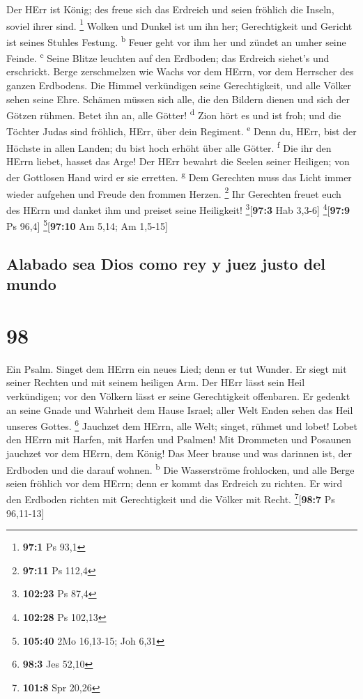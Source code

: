  Der HErr ist König; des freue sich das Erdreich und seien
fröhlich die Inseln, soviel ihrer sind. \footnote{\textbf{97:1} Ps 93,1}
 Wolken und Dunkel ist um ihn her; Gerechtigkeit und
Gericht ist seines Stuhles Festung. \textsuperscript{b} 
Feuer geht vor ihm her und zündet an umher seine Feinde.
\textsuperscript{c}  Seine Blitze leuchten auf den
Erdboden; das Erdreich siehet's und erschrickt.  Berge
zerschmelzen wie Wachs vor dem HErrn, vor dem Herrscher des ganzen
Erdbodens.  Die Himmel verkündigen seine Gerechtigkeit,
und alle Völker sehen seine Ehre.  Schämen müssen sich
alle, die den Bildern dienen und sich der Götzen rühmen. Betet ihn an,
alle Götter! \textsuperscript{d}  Zion hört es und ist
froh; und die Töchter Judas sind fröhlich, HErr, über dein Regiment.
\textsuperscript{e}  Denn du, HErr, bist der Höchste in
allen Landen; du bist hoch erhöht über alle Götter. \textsuperscript{f}
 Die ihr den HErrn liebet, hasset das Arge! Der HErr
bewahrt die Seelen seiner Heiligen; von der Gottlosen Hand wird er sie
erretten. \textsuperscript{g}  Dem Gerechten muss das
Licht immer wieder aufgehen und Freude den frommen Herzen. \footnote{\textbf{97:11}
  Ps 112,4}  Ihr Gerechten freuet euch des HErrn und
danket ihm und preiset seine Heiligkeit! \footnote{\textbf{102:23} Ps
  87,4}{[}\textbf{97:3} Hab 3,3-6{]} \footnote{\textbf{102:28} Ps 102,13}{[}\textbf{97:9}
Ps 96,4{]} \footnote{\textbf{105:40} 2Mo 16,13-15; Joh 6,31}{[}\textbf{97:10}
Am 5,14; Am 1,5-15{]}

\hypertarget{alabado-sea-dios-como-rey-y-juez-justo-del-mundo}{%
\subsection{Alabado sea Dios como rey y juez justo del
mundo}\label{alabado-sea-dios-como-rey-y-juez-justo-del-mundo}}

\hypertarget{section-97}{%
\section{98}\label{section-97}}

 Ein Psalm. Singet dem HErrn ein neues Lied; denn er tut
Wunder. Er siegt mit seiner Rechten und mit seinem heiligen Arm.
 Der HErr lässt sein Heil verkündigen; vor den Völkern
lässt er seine Gerechtigkeit offenbaren.  Er gedenkt an
seine Gnade und Wahrheit dem Hause Israel; aller Welt Enden sehen das
Heil unseres Gottes. \footnote{\textbf{98:3} Jes 52,10} 
Jauchzet dem HErrn, alle Welt; singet, rühmet und lobet! 
Lobet den HErrn mit Harfen, mit Harfen und Psalmen!  Mit
Drommeten und Posaunen jauchzet vor dem HErrn, dem König! 
Das Meer brause und was darinnen ist, der Erdboden und die darauf
wohnen. \textsuperscript{b}  Die Wasserströme frohlocken,
und alle Berge seien fröhlich  vor dem HErrn; denn er
kommt das Erdreich zu richten. Er wird den Erdboden richten mit
Gerechtigkeit und die Völker mit Recht. \footnote{\textbf{101:8} Spr
  20,26}{[}\textbf{98:7} Ps 96,11-13{]}

